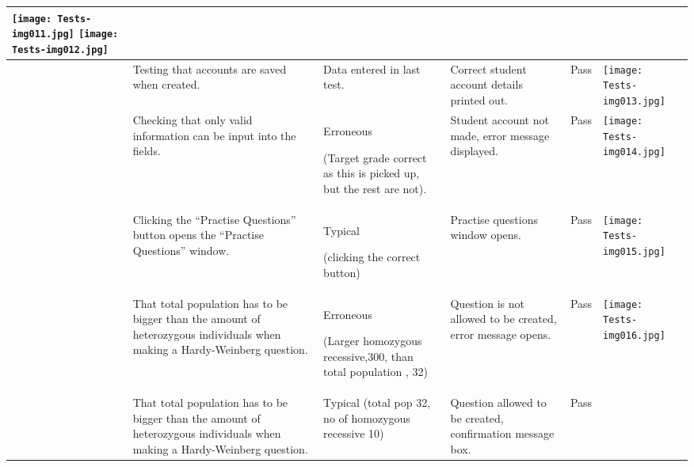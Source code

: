 \documentclass[a4paper,landscape,10pt]{article}
\begin{document}
\begin{flushleft}
\begin{supertabular}{|m{1.1899999cm}|m{2.294cm}|m{2.294cm}|m{3cm}|m{1.305cm}|m{15.190001cm}|}
{\fontsize{11pt}{13.2pt}\selectfont   \texttt{[image: Tests-img011.jpg]}
\texttt{[image: Tests-img012.jpg]}
 }\\\hline
{\fontsize{11pt}{13.2pt}} &
{\fontsize{11pt}{13.2pt}\selectfont Testing that accounts are saved when created.} &
{\fontsize{11pt}{13.2pt}\selectfont Data entered in last test.} &
{\fontsize{11pt}{13.2pt}\selectfont Correct student account details printed out.} &
{\fontsize{11pt}{13.2pt}\selectfont Pass} &
{\fontsize{11pt}{13.2pt}\selectfont  \texttt{[image: Tests-img013.jpg]}
 }\\\hline
{\fontsize{11pt}{13.2pt}} &
{\fontsize{11pt}{13.2pt}\selectfont Checking that only valid information can be input into the fields.} &
{\fontsize{11pt}{13.2pt}\selectfont Erroneous}

{\fontsize{11pt}{13.2pt}\selectfont (Target grade correct as this is picked up, but the rest are not).} &
{\fontsize{11pt}{13.2pt}\selectfont Student account not made, error message displayed.} &
{\fontsize{11pt}{13.2pt}\selectfont Pass} &
{\fontsize{11pt}{13.2pt}\selectfont  \texttt{[image: Tests-img014.jpg]}
 }\\\hline
{\fontsize{11pt}{13.2pt}} &
{\fontsize{11pt}{13.2pt}\selectfont Clicking the ``Practise Questions'' button opens the ``Practise Questions'' window.} &
{\fontsize{11pt}{13.2pt}\selectfont Typical}

{\fontsize{11pt}{13.2pt}\selectfont (clicking the correct button)} &
{\fontsize{11pt}{13.2pt}\selectfont Practise questions window opens.} &
{\fontsize{11pt}{13.2pt}\selectfont Pass} &
{\fontsize{11pt}{13.2pt}\selectfont   \texttt{[image: Tests-img015.jpg]}
 }\\\hline
{\fontsize{11pt}{13.2pt}} &
{\fontsize{11pt}{13.2pt}\selectfont That total population has to be bigger than the amount of heterozygous individuals when making a Hardy-Weinberg question.} &
{\fontsize{11pt}{13.2pt}\selectfont Erroneous}

{\fontsize{11pt}{13.2pt}\selectfont (Larger homozygous recessive,300, than total population , 32)} &
{\fontsize{11pt}{13.2pt}\selectfont Question is not allowed to be created, error message opens.} &
{\fontsize{11pt}{13.2pt}\selectfont Pass} &
{\fontsize{11pt}{13.2pt}\selectfont  \texttt{[image: Tests-img016.jpg]}
 }\\\hline
{\fontsize{11pt}{13.2pt}} &
{\fontsize{11pt}{13.2pt}\selectfont That total population has to be bigger than the amount of heterozygous individuals when making a Hardy-Weinberg question.} &
{\fontsize{11pt}{13.2pt}\selectfont Typical (total pop 32, no of homozygous recessive 10)} &
{\fontsize{11pt}{13.2pt}\selectfont Question allowed to be created, confirmation message box.} &
{\fontsize{11pt}{13.2pt}\selectfont Pass} &
{\fontsize{11pt}{13.2pt}\selectfont ~}


\end{supertabular}
\end{flushleft}
\end{document}
